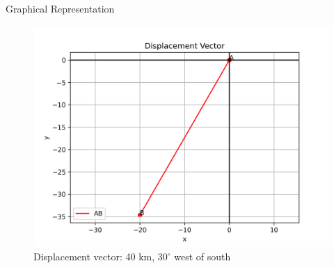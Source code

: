 \documentclass{beamer}
\begin{document}
\begin{frame}{Graphical Representation}
\begin{figure}[h!]
    \centering
    \includegraphics[width=0.65\linewidth]{figs/fig.png}
    \caption{Displacement vector: 40 km, \(30^\circ\) west of south}
\end{figure}
\end{frame}
\end{document}
